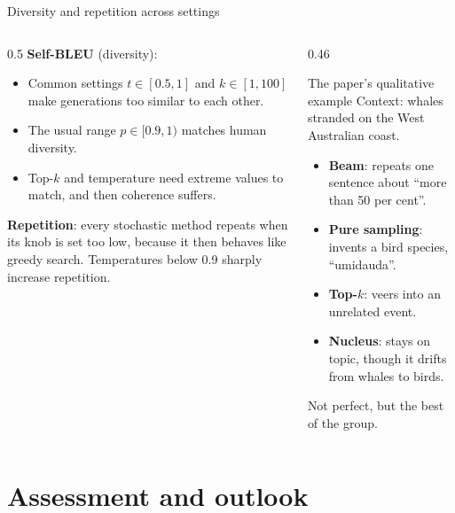 \documentclass[aspectratio=169,11pt]{beamer}
\begin{document}
\begin{frame}{Diversity and repetition across settings}
  \begin{columns}[T]
    \begin{column}{0.5\textwidth}
      \small
      \textbf{Self-BLEU} (diversity):
      \begin{itemize}
        \item Common settings $t\in[0.5,1]$ and $k\in[1,100]$ make generations too similar to each other.
        \item The usual range $p\in[0.9,1)$ matches human diversity.
        \item Top-$k$ and temperature need extreme values to match, and then coherence suffers.
      \end{itemize}
      \textbf{Repetition}: every stochastic method repeats when its knob is set too low, because it then behaves like greedy search. Temperatures below 0.9 sharply increase repetition.
    \end{column}
    \begin{column}{0.46\textwidth}
      \begin{exampleblock}{The paper's qualitative example}
        \small
        Context: whales stranded on the West Australian coast.
        \begin{itemize}
          \item \textbf{Beam}: repeats one sentence about ``more than 50 per cent''.
          \item \textbf{Pure sampling}: invents a bird species, ``umidauda''.
          \item \textbf{Top-$k$}: veers into an unrelated event.
          \item \textbf{Nucleus}: stays on topic, though it drifts from whales to birds.
        \end{itemize}
        Not perfect, but the best of the group.
      \end{exampleblock}
    \end{column}
  \end{columns}
\end{frame}

\section{Assessment and outlook}
\end{document}
